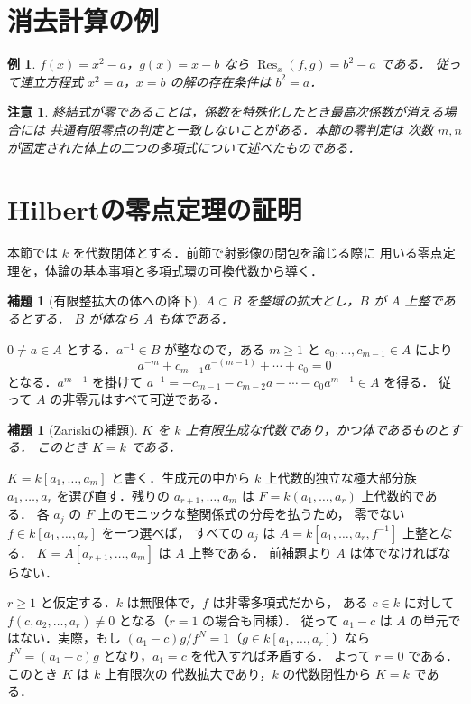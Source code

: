 \documentclass[a5paper,10pt,onecolumn]{jsarticle}
\makeatletter
\theoremstyle{mathnotetheorem}
\newtheorem{lemma}[theorem]{補題}
\newtheorem{example}[theorem]{例}
\newtheorem{remark}[theorem]{注意}
\renewcommand{\proofname}{証明}
\renewenvironment{proof}[1][\proofname]{%
  \par\pushQED{\qed}\normalfont\topsep4\p@\@plus2\p@\relax
  \trivlist\item[\hskip\labelsep\bfseries #1]\ignorespaces
}{\popQED\endtrivlist\@endpefalse}
\makeatother
\begin{document}
\section{消去計算の例}
\begin{example}
$f(x)=x^2-a$，$g(x)=x-b$ なら
$\operatorname{Res}_x(f,g)=b^2-a$ である．
従って連立方程式 $x^2=a$，$x=b$ の解の存在条件は $b^2=a$．
\end{example}
\begin{remark}
終結式が零であることは，係数を特殊化したとき最高次係数が消える場合には
共通有限零点の判定と一致しないことがある．本節の零判定は
次数 $m,n$ が固定された体上の二つの多項式について述べたものである．
\end{remark}


\section{Hilbertの零点定理の証明}
本節では $k$ を代数閉体とする．前節で射影像の閉包を論じる際に
用いる零点定理を，体論の基本事項と多項式環の可換代数から導く．
\begin{lemma}[有限整拡大の体への降下]
$A\subset B$ を整域の拡大とし，$B$ が $A$ 上整であるとする．
$B$ が体なら $A$ も体である．
\end{lemma}
\begin{proof}
$0\ne a\in A$ とする．$a^{-1}\in B$ が整なので，ある $m\ge1$ と
$c_0,\ldots,c_{m-1}\in A$ により
\[
 a^{-m}+c_{m-1}a^{-(m-1)}+\cdots+c_0=0
\]
となる．$a^{m-1}$ を掛けて
$a^{-1}=-c_{m-1}-c_{m-2}a-\cdots-c_0a^{m-1}\in A$ を得る．
従って $A$ の非零元はすべて可逆である．
\end{proof}
\begin{lemma}[Zariskiの補題]
$K$ を $k$ 上有限生成な代数であり，かつ体であるものとする．
このとき $K=k$ である．
\end{lemma}
\begin{proof}
$K=k[a_1,\ldots,a_m]$ と書く．生成元の中から
$k$ 上代数的独立な極大部分族
$a_1,\ldots,a_r$ を選び直す．残りの $a_{r+1},\ldots,a_m$ は
$F=k(a_1,\ldots,a_r)$ 上代数的である．
各 $a_j$ の $F$ 上のモニックな整関係式の分母を払うため，
零でない $f\in k[a_1,\ldots,a_r]$ を一つ選べば，
すべての $a_j$ は
$A=k[a_1,\ldots,a_r,f^{-1}]$ 上整となる．
$K=A[a_{r+1},\ldots,a_m]$ は $A$ 上整である．
前補題より $A$ は体でなければならない．

$r\ge1$ と仮定する．$k$ は無限体で，$f$ は非零多項式だから，
ある $c\in k$ に対して
$f(c,a_2,\ldots,a_r)\ne0$ となる（$r=1$ の場合も同様）．
従って $a_1-c$ は $A$ の単元ではない．実際，もし
$(a_1-c)g/f^N=1$（$g\in k[a_1,\ldots,a_r]$）なら
$f^N=(a_1-c)g$ となり，$a_1=c$ を代入すれば矛盾する．
よって $r=0$ である．このとき $K$ は $k$ 上有限次の
代数拡大であり，$k$ の代数閉性から $K=k$ である．
\end{proof}
\end{document}
